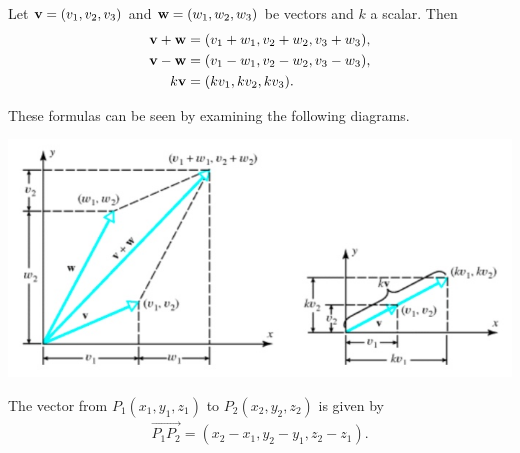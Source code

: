 \documentclass[12pt,letterpaper,reqno]{article}
\numberwithin{equation}{section}
\begin{document}
\begin{prop}
	Let ${\bf v}=(v_1,v_2,v_3)$ and ${\bf w}=(w_1,w_2,w_3)$ be vectors and $k$ a scalar. Then
	\begin{align*}
		{\bf v}+{\bf w}&=(v_1+w_1,v_2+w_2,v_3+w_3), \\
		{\bf v}-{\bf w}&=(v_1-w_1,v_2-w_2,v_3-w_3), \\
		k{\bf v}&=(kv_1,kv_2,kv_3).
	\end{align*}
\end{prop}

\begin{pf}
These formulas can be seen by examining the following diagrams.
\begin{center}
	\includegraphics[scale=0.5]{figures_mvc/vector_operations}
\end{center}	
\end{pf}

\begin{prop}\label{prop:vector_from_one_point_to_another}
	The vector from $P_1(x_1,y_1,z_1)$ to $P_2(x_2,y_2,z_2)$ is given by
	\begin{align*}
		\overrightarrow{P_1P_2}=(x_2-x_1,y_2-y_1,z_2-z_1).
	\end{align*}
\end{prop}
\end{document}
